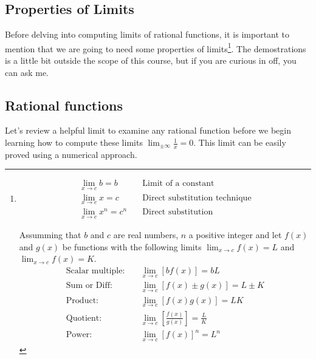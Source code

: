 \documentclass[../main-notes.tex]{subfile}
\begin{document}
\subsection{Properties of Limits}

Before delving into computing limits of rational functions, it is important to mention that we are going to need some properties of limits\footnote{
\begin{align*}
    \lim_{x\to c} b = b &\quad\text{Limit~of~a~constant} \\
    \lim_{x\to c} x = c  &\quad\text{Direct~substitution~technique} \\
    \lim_{x\to c} x^n = c^n &\quad\text{Direct~substitution}
\end{align*}

Assumming that $b$ and $c$ are real numbers, $n$ a positive integer and let $f(x)$ and $g(x)$ be functions with the following limits \(\lim_{x\to c}f(x)=L\) and \(\lim_{x\to c}f(x)=K\).
\begin{align*}
    \text{Scalar~multiple:} &\quad \lim_{x\to c}\left[b f(x)\right]=bL\\
    \text{Sum~or~Diff:} &\quad \lim_{x\to c}\left[f(x)\pm g(x)\right]=L\pm K\\
    \text{Product:} &\quad \lim_{x\to c}\left[f(x)g(x)\right]=LK\\
    \text{Quotient:} &\quad \lim_{x\to c}\left[\frac{f(x)}{g(x)}\right]=\frac{L}{K} \\
    \text{Power:} &\quad \lim_{x\to c}\left[f(x)\right]^{n}=L^{n}
\end{align*}
}.
The demostrations is a little bit outside the scope of this course, but if you are curious in off, you can ask me.

\subsection{Rational functions}

Let's review a helpful limit to examine any rational function before we begin learning how to compute these limits \(\lim_{\pm\infty}\frac{1}{x} = 0\).
This limit can be easily proved using a numerical approach.
\end{document}
